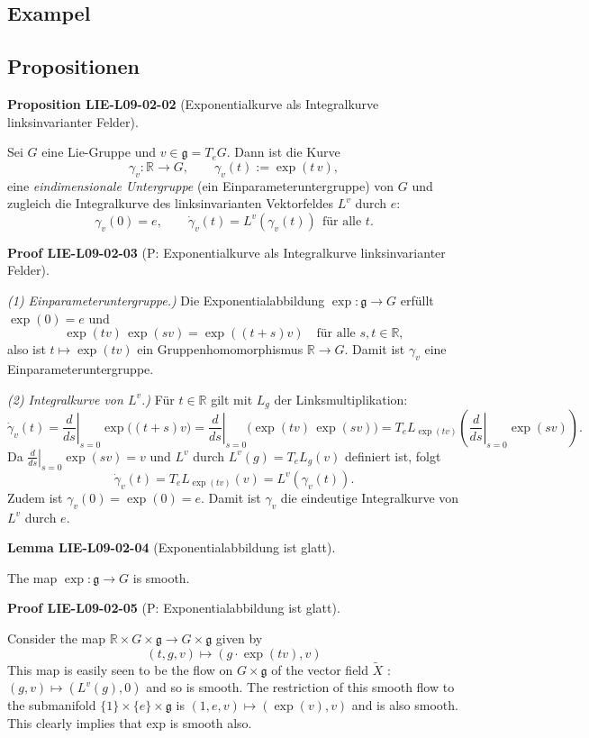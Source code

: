 \documentclass[10pt, letterpaper]{article}
\newcommand{\CustomHeading}[3]{%
  \par\medskip\noindent%
  \textbf{#1 #2} \textnormal{(#3)}.\enskip%
}
\newenvironment{PROP}[2]{\CustomHeading{Proposition}{#1}{#2}}{}
\newenvironment{LEM}[2]{\CustomHeading{Lemma}{#1}{#2}}{}
\newenvironment{PROOF}[2]{\CustomHeading{Proof}{#1}{#2}}{}
\begin{document}
\subsection{Exampel}

\subsection{Propositionen}

\begin{PROP}{LIE-L09-02-02}{Exponentialkurve als Integralkurve linksinvarianter Felder}
Sei $G$ eine Lie-Gruppe und $v\in\mathfrak g=T_eG$.
Dann ist die Kurve
\[
\gamma_v:\mathbb R\to G,\qquad \gamma_v(t):=\exp(t\,v),
\]
eine \emph{eindimensionale Untergruppe} (ein Einparameteruntergruppe) von $G$
und zugleich die Integralkurve des linksinvarianten Vektorfeldes $L^{v}$
durch $e$:
\[
\gamma_v(0)=e,\qquad \dot{\gamma}_v(t)=L^{v}(\gamma_v(t))\ \ \text{für alle }t.
\]
\end{PROP}

\begin{PROOF}{LIE-L09-02-03}{P: Exponentialkurve als Integralkurve linksinvarianter Felder}
\emph{(1) Einparameteruntergruppe.)}
Die Exponentialabbildung $\exp:\mathfrak g\to G$ erfüllt $\exp(0)=e$ und
\[
\exp(t v)\,\exp(s v)=\exp((t+s)v)\quad\text{für alle }s,t\in\mathbb R,
\]
also ist $t\mapsto \exp(tv)$ ein Gruppenhomomorphismus $\mathbb R\to G$.
Damit ist $\gamma_v$ eine Einparameteruntergruppe.

\medskip
\emph{(2) Integralkurve von $L^v$.)}
Für $t\in\mathbb R$ gilt mit $L_g$ der Linksmultiplikation:
\[
\dot{\gamma}_v(t)
=\left.\frac{d}{ds}\right|_{s=0}\exp\bigl((t+s)v\bigr)
=\left.\frac{d}{ds}\right|_{s=0}\bigl(\exp(tv)\,\exp(sv)\bigr)
= T_e L_{\exp(tv)}\!\left(\left.\frac{d}{ds}\right|_{s=0}\exp(sv)\right).
\]
Da $\left.\frac{d}{ds}\right|_{s=0}\exp(sv)=v$ und $L^v$ durch
$L^v(g)=T_e L_g(v)$ definiert ist, folgt
\[
\dot{\gamma}_v(t)=T_e L_{\exp(tv)}(v)=L^v(\gamma_v(t)).
\]
Zudem ist $\gamma_v(0)=\exp(0)=e$. Damit ist $\gamma_v$ die eindeutige
Integralkurve von $L^v$ durch $e$.
\end{PROOF}

\begin{LEM}{LIE-L09-02-04}{Exponentialabbildung ist glatt}
The map $\exp : \mathfrak{g} \rightarrow G$ is smooth.
\end{LEM}

\begin{PROOF}{LIE-L09-02-05}{P: Exponentialabbildung ist glatt}
Consider the map $\mathbb{R} \times G \times \mathfrak{g} \rightarrow G \times \mathfrak{g}$ given by
$$
(t, g, v) \mapsto(g \cdot \exp (t v), v)
$$
This map is easily seen to be the flow on $G \times \mathfrak{g}$ of the vector field $\widetilde{X}$ : $(g,v) \mapsto\left(L^{v}(g), 0\right)$ and so is smooth. The restriction of this smooth flow to the submanifold $\{1\} \times\{e\} \times \mathfrak{g}$ is $(1, e, v) \mapsto(\exp (v), v)$ and is also smooth. This clearly implies that exp is smooth also.
\end{PROOF}
\end{document}

